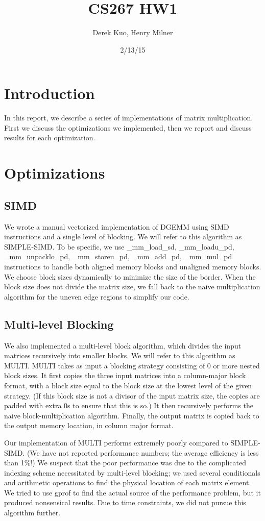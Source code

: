 \documentclass{article}
\author{Derek Kuo, Henry Milner}
\title{CS267 HW1}
\date{2/13/15}
\begin{document}
\maketitle

\section{Introduction}
In this report, we describe a series of implementations of matrix multiplication.  First we discuss the optimizations we implemented, then we report and discuss results for each optimization.

\section{Optimizations}
\subsection{SIMD}
We wrote a manual vectorized implementation of DGEMM using SIMD instructions and a single level of blocking. We will refer to this algorithm as SIMPLE-SIMD. To be specific, we use \_mm\_load\_sd, \_mm\_loadu\_pd, \_mm\_unpacklo\_pd, \_mm\_storeu\_pd, \_mm\_add\_pd, \_mm\_mul\_pd instructions to handle both aligned memory blocks and unaligned memory blocks.  We choose block sizes dynamically to minimize the size of the border.  When the block size does not divide the matrix size, we fall back to the naive multiplication algorithm for the uneven edge regions to simplify our code.

\subsection{Multi-level Blocking}
We also implemented a multi-level block algorithm, which divides the input matrices recursively into smaller blocks.  We will refer to this algorithm as MULTI.  MULTI takes as input a blocking strategy consisting of 0 or more nested block sizes.  It first copies the three input matrices into a column-major block format, with a block size equal to the block size at the lowest level of the given strategy.  (If this block size is not a divisor of the input matrix size, the copies are padded with extra 0s to ensure that this is so.)  It then recursively performs the naive block-multiplication algorithm.  Finally, the output matrix is copied back to the output memory location, in column major format.

Our implementation of MULTI performs extremely poorly compared to SIMPLE-SIMD.  (We have not reported performance numbers; the average efficiency is less than 1\%!)  We suspect that the poor performance was due to the complicated indexing scheme necessitated by multi-level blocking; we used several conditionals and arithmetic operations to find the physical location of each matrix element.  We tried to use gprof to find the actual source of the performance problem, but it produced nonsensical results.  Due to time constraints, we did not pursue this algorithm further.
\end{document}
